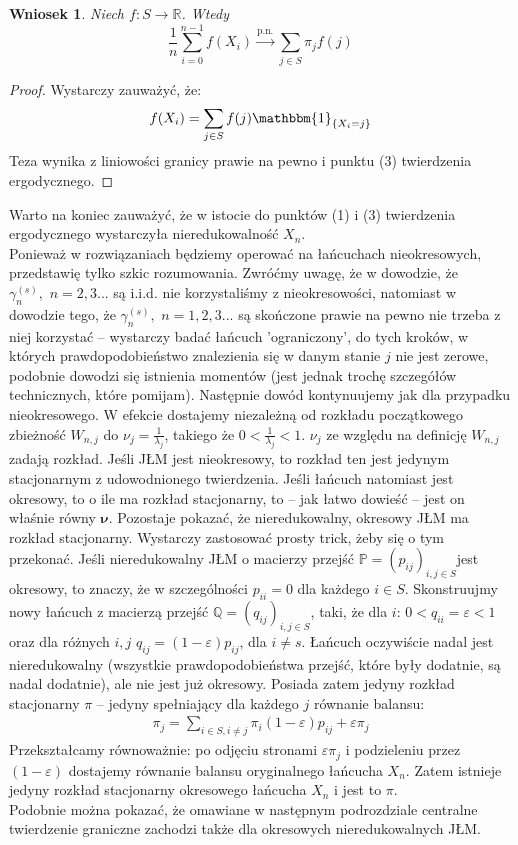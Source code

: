 \documentclass[a4paper]{article}
\theoremstyle{defn}
\theoremstyle{theorem}
\theoremstyle{lemma}
\theoremstyle{cor}
\newtheorem{cor}[defn]{Wniosek}
\theoremstyle{fact}
\begin{document}
\begin{cor}\label{cor2.5.14}
Niech $f: S \to \mathbb{R}$. Wtedy
$$ \frac{1}{n} \sum\limits_{i=0}^{n-1} f(X_i) \overset{\text{p.n.}}{\to} \sum\limits_{j \in S} \pi_j f(j)$$
\end{cor}
\begin{proof}
Wystarczy zauważyć, że:
$$ f(X_i) = \sum\limits_{j \in S} f(j)\mathbbm{1}_{\{X_i = j\}}$$
Teza wynika z liniowości granicy prawie na pewno i punktu (3) twierdzenia ergodycznego.
\end{proof}
Warto na koniec zauważyć, że w istocie do punktów (1) i (3) twierdzenia ergodycznego wystarczyła nieredukowalność $X_n$. \\
Ponieważ w rozwiązaniach będziemy operować na łańcuchach nieokresowych, przedstawię tylko szkic rozumowania. Zwróćmy uwagę, że w dowodzie, że $\gamma_n^{(s)},\,\, n = 2,3...$ są i.i.d. nie korzystaliśmy z nieokresowości, natomiast w dowodzie tego, że $\gamma_n^{(s)},\,\, n = 1,2,3...$ są skończone prawie na pewno nie trzeba z niej korzystać – wystarczy badać łańcuch 'ograniczony', do tych kroków, w których prawdopodobieństwo znalezienia się w danym stanie $j$ nie jest zerowe, podobnie dowodzi się istnienia momentów (jest jednak trochę szczegółów technicznych, które pomijam). Następnie dowód kontynuujemy jak dla przypadku nieokresowego. W efekcie dostajemy niezależną od rozkładu początkowego zbieżność $W_{n,j}$ do $\nu_j = \frac{1}{\lambda_j}$, takiego że $0 < \frac{1}{\lambda_j} < 1$. $\nu_j$ ze względu na definicję $W_{n,j}$ zadają rozkład. Jeśli JŁM jest nieokresowy, to rozkład ten jest jedynym stacjonarnym z udowodnionego twierdzenia. Jeśli łańcuch natomiast jest okresowy, to o ile ma rozkład stacjonarny, to – jak łatwo dowieść – jest on właśnie równy $\boldsymbol{\nu}$. Pozostaje pokazać, że nieredukowalny, okresowy JŁM ma rozkład stacjonarny. Wystarczy zastosować prosty trick, żeby się o tym przekonać. Jeśli nieredukowalny JŁM o macierzy przejść $\mathbb{P} = (p_{ij})_{i,j \in S}$jest okresowy, to znaczy, że w szczególności $p_{ii} = 0$ dla każdego $i \in S$. Skonstruujmy nowy łańcuch z macierzą przejść $\mathbb{Q} = (q_{ij})_{i,j \in S}$, taki, że dla $i$: $0 < q_{ii} = \varepsilon < 1$ oraz dla różnych $i,j$ $q_{ij} = (1-\varepsilon)p_{ij}$, dla $i \neq s$. Łańcuch oczywiście nadal jest nieredukowalny (wszystkie prawdopodobieństwa przejść, które były dodatnie, są nadal dodatnie), ale nie jest już okresowy. Posiada zatem jedyny rozkład stacjonarny $\pi$ – jedyny spełniający dla każdego $j$ równanie balansu:
\begin{align*}
    \pi_j = \sum\limits_{i \in S, i \neq j} \pi_i (1-\varepsilon) p_{ij}  + \varepsilon \pi_j
\end{align*}
Przekształcamy równoważnie: po odjęciu stronami $\varepsilon \pi_j$ i podzieleniu przez $(1-\varepsilon)$ dostajemy równanie balansu oryginalnego łańcucha $X_n$. Zatem istnieje jedyny rozkład stacjonarny okresowego łańcucha $X_n$ i jest to $\pi$.
\\
Podobnie można pokazać, że omawiane w następnym podrozdziale centralne twierdzenie graniczne zachodzi także dla okresowych nieredukowalnych JŁM.
\end{document}

